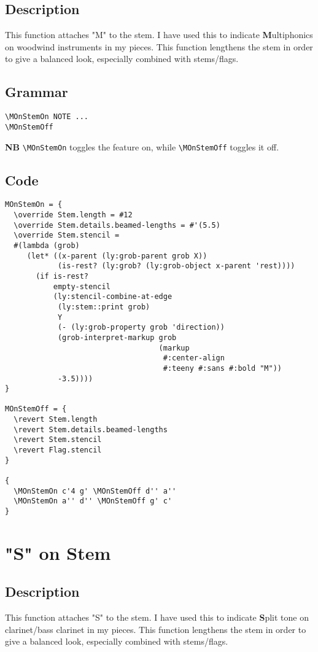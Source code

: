 \documentclass[11pt, oneside]{book}   	%
\begin{document}
\subsection{Description}
This function attaches "M" to the stem. I have used this to indicate \textbf{M}ultiphonics on woodwind instruments in my pieces. This function lengthens the stem in order to give a balanced look, especially combined with stems/flags. 
\subsection{Grammar}
\begin{verbatim}
\MOnStemOn NOTE ...
\MOnStemOff
\end{verbatim}
\textbf{NB} \verb |\MOnStemOn| toggles the feature on, while \verb|\MOnStemOff| toggles it off.

\subsection{Code}
\begin{verbatim}
MOnStemOn = {
  \override Stem.length = #12
  \override Stem.details.beamed-lengths = #'(5.5)
  \override Stem.stencil =
  #(lambda (grob)
     (let* ((x-parent (ly:grob-parent grob X))
            (is-rest? (ly:grob? (ly:grob-object x-parent 'rest))))
       (if is-rest?
           empty-stencil
           (ly:stencil-combine-at-edge
            (ly:stem::print grob)
            Y
            (- (ly:grob-property grob 'direction))
            (grob-interpret-markup grob
                                   (markup
                                    #:center-align
                                    #:teeny #:sans #:bold "M"))
            -3.5))))
}

MOnStemOff = {
  \revert Stem.length
  \revert Stem.details.beamed-lengths
  \revert Stem.stencil
  \revert Flag.stencil
}

{
  \MOnStemOn c'4 g' \MOnStemOff d'' a''
  \MOnStemOn a'' d'' \MOnStemOff g' c'
}
\end{verbatim}
\vfill \break



\section {"S" on Stem}
\hfill

\subsection{Description}
This function attaches "S" to the stem. I have used this to indicate \textbf{S}plit tone on clarinet/bass clarinet in my pieces. This function lengthens the stem in order to give a balanced look, especially combined with stems/flags. 
\end{document}
